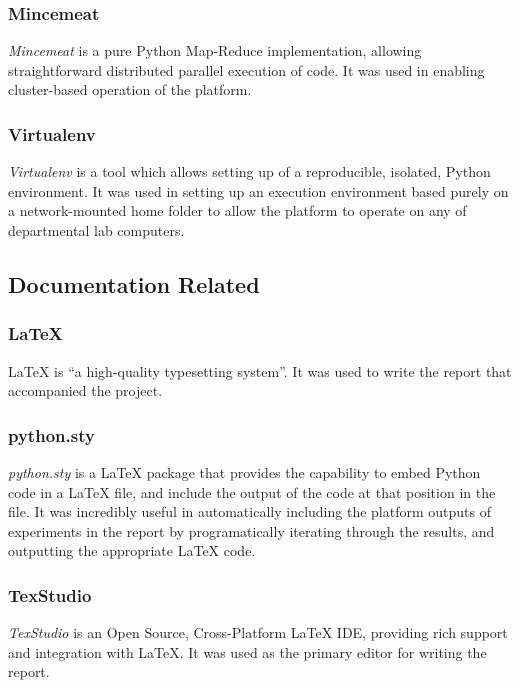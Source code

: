 \documentclass[a4paper,11pt]{report}
\begin{document}
\subsubsection*{Mincemeat}
\emph{Mincemeat} \citep{prog:mincemeat} is a pure Python Map-Reduce implementation, allowing straightforward distributed parallel execution of code. It was used in enabling cluster-based operation of the platform.

\subsubsection*{Virtualenv}
\emph{Virtualenv} \citep{prog:virtualenv} is a tool which allows setting up of a reproducible, isolated, Python environment. It was used in setting up an execution environment based purely on a network-mounted home folder to allow the platform to operate on any of departmental lab computers.

\subsection{Documentation Related}

\subsubsection*{\LaTeX{}}
\LaTeX{} \citep{prog:latex} is ``a high-quality typesetting system''. It was used to write the report that accompanied the project.

\subsubsection*{python.sty}
\emph{python.sty} \citep{prog:pythonsty} is a \LaTeX{} package that provides the capability to embed Python code in a \LaTeX{} file, and include the output of the code at that position in the file. It was incredibly useful in automatically including the platform outputs of experiments in the report by programatically iterating through the results, and outputting the appropriate \LaTeX{} code.

\subsubsection*{TexStudio}
\emph{TexStudio} \citep{prog:texstudio} is an Open Source, Cross-Platform \LaTeX{} IDE, providing rich support and integration with \LaTeX{}. It was used as the primary editor for writing the report.
\end{document}
